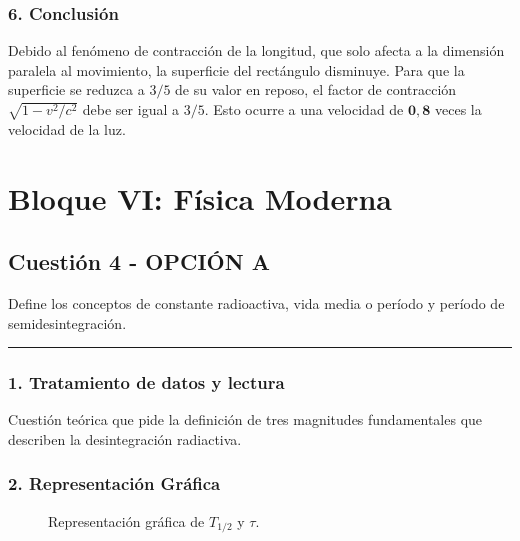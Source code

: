 \subsubsection*{6. Conclusión}
\begin{cajaconclusion}
    Debido al fenómeno de contracción de la longitud, que solo afecta a la dimensión paralela al movimiento, la superficie del rectángulo disminuye. Para que la superficie se reduzca a $3/5$ de su valor en reposo, el factor de contracción $\sqrt{1-v^2/c^2}$ debe ser igual a $3/5$. Esto ocurre a una velocidad de $\mathbf{0,8}$ veces la velocidad de la luz.
\end{cajaconclusion}

\newpage

\section{Bloque VI: Física Moderna}
\label{sec:moderna_2005_jun_cv}

\subsection{Cuestión 4 - OPCIÓN A}
\label{subsec:6A_2005_jun_cv}

\begin{cajaenunciado}
Define los conceptos de constante radioactiva, vida media o período y período de semidesintegración.
\end{cajaenunciado}
\hrule

\subsubsection*{1. Tratamiento de datos y lectura}
Cuestión teórica que pide la definición de tres magnitudes fundamentales que describen la desintegración radiactiva.

\subsubsection*{2. Representación Gráfica}
\begin{figure}[H]
    \centering
    \caption{Representación gráfica de $T_{1/2}$ y $\tau$.}
\end{figure}

